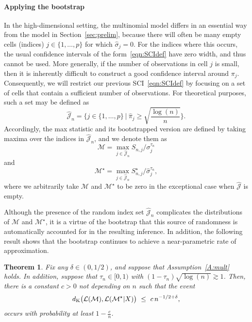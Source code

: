 \documentclass[aos,preprint]{imsart}
\numberwithin{equation}{section}
\theoremstyle{plain}
\newtheorem{theorem}{Theorem}[section]
\newcommand{\M}{\mathcal{M}}
\renewcommand{\hat}[1]{\widehat{#1}}
\newcommand{\J}{\mathcal{J}}
\renewcommand{\L}{\mathcal{L}}
\newcommand{\ts}{\textstyle}
\newcommand{\1}{{\bf{1}}}
\newcommand{\0}{\mathbf{0}}
\begin{document}
\paragraph{Applying the bootstrap} In the high-dimensional setting, the multinomial model differs in an essential way from the model in Section~\ref{sec:prelim}, because there will often be many empty cells (indices) $j\in\{1,\dots,p\}$ for which $\hat\sigma_j=0$. For the indices where this occurs, the usual confidence intervals of the form~\eqref{eqn:SCIdef} have zero width, and thus cannot be used. More generally, if the number of observations in cell $j$ is small, then it is inherently difficult to construct a good confidence interval around $\pi_j$. Consequently, we will restrict our previous SCI~\eqref{eqn:SCIdef} by focusing on a set of cells that contain a sufficient number of observations.
%
For theoretical purposes, such a set may be defined as
%
\begin{equation}\label{eq:Jn}
\hat{\mathcal{J}}_n=\Big\{j\in \{1,\dots,p\} \ \Big| \ \hat\pi_j\geq \sqrt{\ts\frac{\log(n)}{n}}\Big\}.
\end{equation}
Accordingly, the max statistic and its bootstrapped version are defined by taking maxima over the indices  in $\hat{\mathcal{J}}_n$, and we denote them as
$$\M = \max_{j\in\hat\J_n} S_{n,j}/\sigma_j^{\tau_n}$$
and 
$$\M^{\star} = \max_{j\in\hat\J_n} S_{n,j}^{\star}/\hat\sigma_j^{\tau_n},$$
where we arbitrarily take $\mathcal{M}$ and $\mathcal{M}^{\star}$ to be zero in the exceptional case when $\hat{\mathcal{J}}$ is empty.

Although the presence of the random index set $\hat\J_n$ complicates the distributions of $\mathcal{M}$ and $\mathcal{M}^{\star}$, it is a virtue of the bootstrap that this source of randomness is automatically accounted for in the resulting inference.
In addition, the following result shows that the bootstrap continues to achieve a near-parametric rate of approximation. 
%
\begin{theorem}\label{THM:M} Fix any $\delta\in(0,1/2)$, and suppose that Assumption~\ref{A:mult} holds. In addition, suppose that $\tau_n\in[0,1)$ with $(1-\tau_n)\sqrt{\log(n)}\gtrsim 1$. Then, there is a constant $c>0$ not depending on $n$ such that the event
\begin{equation}
 d_{\textup{K}}\big(\L(\M), \L(\M^{\star}|X)\big) \ \leq \ c \, n^{-1/2+\delta},
\end{equation}
occurs with probability at least $1-\frac cn$.
\end{theorem}
\end{document}
